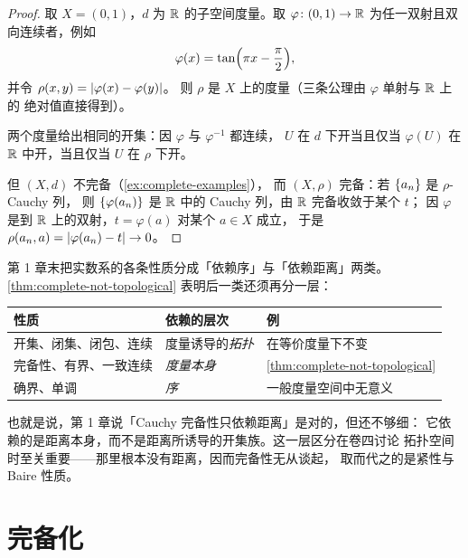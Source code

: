\begin{proof}
  取 \(X = (0,1)\)，\(d\) 为 \(\mathbb{R}\) 的子空间度量。取 \(\varphi \colon (0,1) \to \mathbb{R}\)
  为任一双射且双向连续者，例如
  \begin{equation}
    \label{eq:phi-homeo}
    \varphi(x) = \tan\Bigl(\pi x - \frac{\pi}{2}\Bigr),
  \end{equation}
  并令 \(\rho(x,y) = \lvert\varphi(x)-\varphi(y)\rvert\)。
  则 \(\rho\) 是 \(X\) 上的度量（三条公理由 \(\varphi\) 单射与 \(\mathbb{R}\) 上的
  绝对值直接得到）。

  两个度量给出相同的开集：因 \(\varphi\) 与 \(\varphi^{-1}\) 都连续，
  \(U\) 在 \(d\) 下开当且仅当 \(\varphi(U)\) 在 \(\mathbb{R}\) 中开，当且仅当 \(U\) 在 \(\rho\) 下开。

  但 \((X,d)\) 不完备（\cref{ex:complete-examples}），
  而 \((X,\rho)\) 完备：若 \(\{a_{n}\}\) 是 \(\rho\)-Cauchy 列，
  则 \(\{\varphi(a_{n})\}\) 是 \(\mathbb{R}\) 中的 Cauchy 列，由 \(\mathbb{R}\) 完备收敛于某个 \(t\)；
  因 \(\varphi\) 是到 \(\mathbb{R}\) 上的双射，\(t = \varphi(a)\) 对某个 \(a \in X\) 成立，
  于是 \(\rho(a_{n},a) = \lvert\varphi(a_{n})-t\rvert \to 0\)。
\end{proof}

\begin{remark}[对第 1 章对照表的修正]
  第 1 章末把实数系的各条性质分成「依赖序」与「依赖距离」两类。
  \cref{thm:complete-not-topological} 表明后一类还须再分一层：

  \begin{center}
  \begin{tabular}{@{}lll@{}}
    \toprule
    性质 & 依赖的层次 & 例 \\
    \midrule
    开集、闭集、闭包、连续 & 度量诱导的\emph{拓扑} & 在等价度量下不变 \\
    完备性、有界、一致连续 & \emph{度量本身} & \cref{thm:complete-not-topological} \\
    确界、单调 & \emph{序} & 一般度量空间中无意义 \\
    \bottomrule
  \end{tabular}
  \end{center}

  也就是说，第 1 章说「Cauchy 完备性只依赖距离」是对的，但还不够细：
  它依赖的是距离本身，而不是距离所诱导的开集族。这一层区分在卷四讨论
  拓扑空间时至关重要——那里根本没有距离，因而完备性无从谈起，
  取而代之的是紧性与 Baire 性质。
\end{remark}

\section{完备化}
\label{sec:completion}

